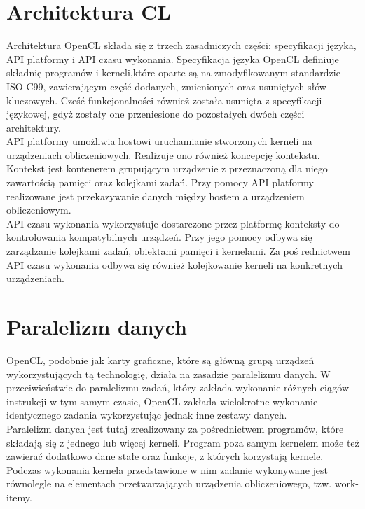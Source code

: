 \section{Architektura CL}
Architektura OpenCL składa się z trzech zasadniczych części: specyfikacji języka, API platformy i API czasu wykonania. Specyfikacja języka OpenCL definiuje składnię programów i kerneli,które oparte są na zmodyfikowanym standardzie ISO C99, zawierającym część dodanych, zmienionych oraz usuniętych słów kluczowych. Cześć funkcjonalności również została usunięta z specyfikacji językowej, gdyż zostały one przeniesione do pozostałych dwóch części architektury. \\
API platformy umożliwia hostowi uruchamianie stworzonych kerneli na urządzeniach obliczeniowych. Realizuje ono również koncepcję kontekstu. Kontekst jest kontenerem grupującym urządzenie z przeznaczoną dla niego zawartością pamięci oraz kolejkami zadań. Przy pomocy API platformy realizowane jest przekazywanie danych między hostem a urządzeniem obliczeniowym. \\
API czasu wykonania wykorzystuje dostarczone przez platformę konteksty do kontrolowania kompatybilnych urządzeń. Przy jego pomocy odbywa się zarządzanie kolejkami zadań, obiektami pamięci i kernelami. Za poś rednictwem API czasu wykonania odbywa się również kolejkowanie kerneli na konkretnych urządzeniach.

\section{Paralelizm danych}
OpenCL, podobnie jak karty graficzne, które są główną grupą urządzeń wykorzystujących tą technologię, działa na zasadzie paralelizmu danych. W przeciwieństwie do paralelizmu zadań, który zakłada wykonanie różnych ciągów instrukcji w tym samym czasie, OpenCL zakłada wielokrotne wykonanie identycznego zadania wykorzystując jednak inne zestawy danych. \\
Paralelizm danych jest tutaj zrealizowany za pośrednictwem programów, które składają się z jednego lub więcej kerneli. Program poza samym kernelem może też zawierać dodatkowo dane stałe oraz funkcje, z których korzystają kernele. Podczas wykonania kernela przedstawione w nim zadanie wykonywane jest równolegle na elementach przetwarzających urządzenia obliczeniowego, tzw. work-itemy. \\

